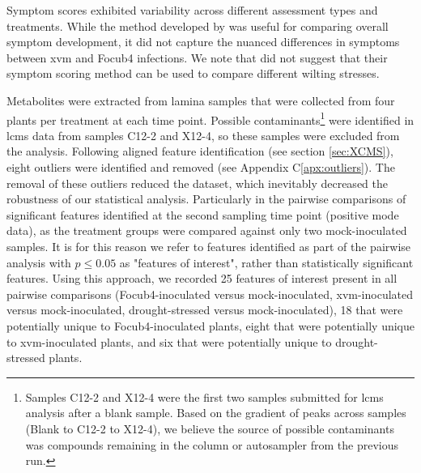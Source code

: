 Symptom scores exhibited variability across different assessment types and treatments. While the method developed by \textcite{Garcia-Bastidas2019} was useful for comparing overall symptom development, it did not capture the nuanced differences in symptoms between \ac{xvm} and \ac{Focub4} infections. We note that \textcite{Garcia-Bastidas2019} did not suggest that their symptom scoring method can be used to compare different wilting stresses.

\bigskip
\noindent
Metabolites were extracted from lamina samples that were collected from four plants per treatment at each time point. Possible contaminants\footnote{Samples C12-2 and X12-4 were the first two samples submitted for \ac{lcms} analysis after a blank sample. Based on the gradient of peaks across samples (Blank to C12-2 to X12-4), we believe the source of possible contaminants was compounds remaining in the column or autosampler from the previous run.} were identified in \ac{lcms} data from samples C12-2 and X12-4, so these samples were excluded from the analysis. Following aligned feature identification (see section \ref{sec:XCMS}), eight outliers were identified and removed (see Appendix C\ref{apx:outliers}). The removal of these outliers reduced the dataset, which inevitably decreased the robustness of our statistical analysis. Particularly in the pairwise comparisons of significant features identified at the second sampling time point (positive mode data), as the treatment groups were compared against only two mock-inoculated samples. It is for this reason we refer to features identified as part of the pairwise analysis with $p \le 0.05$ as "features of interest", rather than statistically significant features. Using this approach, we recorded 25 features of interest present in all pairwise comparisons (\ac{Focub4}-inoculated versus mock-inoculated, \ac{xvm}-inoculated versus mock-inoculated, drought-stressed versus mock-inoculated), 18 that were potentially unique to \ac{Focub4}-inoculated plants, eight that were potentially unique to \ac{xvm}-inoculated plants, and six that were potentially unique to drought-stressed plants. 

